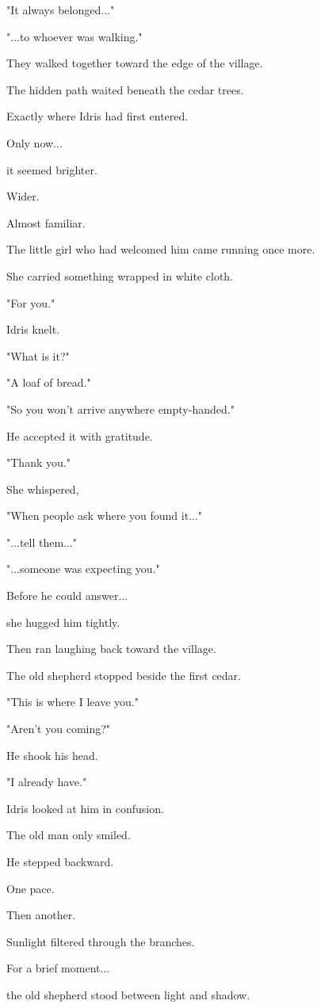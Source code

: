 \documentclass[12pt,openany]{book}
\begin{document}
"It always belonged..."

"...to whoever was walking."

They walked together toward the edge of the village.

The hidden path waited beneath the cedar trees.

Exactly where Idris had first entered.

Only now...

it seemed brighter.

Wider.

Almost familiar.

The little girl who had welcomed him came running once more.

She carried something wrapped in white cloth.

"For you."

Idris knelt.

"What is it?"

"A loaf of bread."

"So you won't arrive anywhere empty-handed."

He accepted it with gratitude.

"Thank you."

She whispered,

"When people ask where you found it..."

"...tell them..."

"...someone was expecting you."

Before he could answer...

she hugged him tightly.

Then ran laughing back toward the village.

The old shepherd stopped beside the first cedar.

"This is where I leave you."

"Aren't you coming?"

He shook his head.

"I already have."

Idris looked at him in confusion.

The old man only smiled.

He stepped backward.

One pace.

Then another.

Sunlight filtered through the branches.

For a brief moment...

the old shepherd stood between light and shadow.
\end{document}
